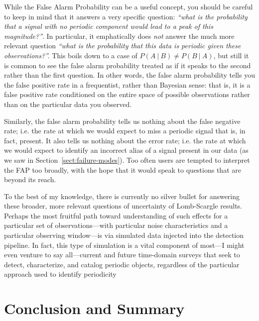 \documentclass[preprint]{aastex}
\newcommand{\Sect}[1]{Section~\ref{sect:#1}}
\newcommand{\sect}[1]{\Sect{#1}}
\newcommand{\sectlabel}[1]{\label{sect:#1}}
\begin{document}

While the False Alarm Probability can be a useful concept, you should be
careful to keep in mind that it answers a very specific question:
{\it ``what is the probability that a signal with no periodic component would
  lead to a peak of this magnitude?''}.
In particular, it emphatically does {\it not} answer the much more relevant
question {\it ``what is the probability that this data is periodic
  given these observations?''.}
This boils down to a case of $P(A~|~B) \ne P(B~|~A)$, but still it is common to
see the false alarm probability treated as if it speaks to the second rather
than the first question.
In other words, the false alarm probability tells you the false positive rate
in a frequentist, rather than Bayesian sense: that is, it is a false positive
rate conditioned on the entire space of possible observations rather than on
the particular data you observed.

Similarly, the false alarm probability tells us nothing about the false
negative rate; {i.e.} the rate at which
we would expect to miss a periodic signal that is, in fact, present.
It also tells us nothing about the error rate; {i.e.} the rate at which we
would expect to identify an incorrect alias of a signal present in our data
(as we saw in \sect{failure-modes}).
Too often users are tempted to interpret the FAP too broadly, with the hope that
it would speak to questions that are beyond its reach.

To the best of my knowledge, there is currently no silver bullet for answering
these broader, more relevant questions of uncertainty of Lomb-Scargle results.
Perhaps the most fruitful path toward understanding of such effects for a
particular set of observations---with particular noise characteristics and a
particular observing window---is via simulated data injected into the detection
pipeline.
In fact, this type of simulation is a vital component of most---I might even
venture to say all---current and future time-domain surveys that seek to
detect, characterize, and catalog periodic objects,
regardless of the particular approach used to identify periodicity
\citep[see, e.g.][]{opsim1, opsim2, Ivezic08LSST, Sesar2010,
  Oluseyi12, McQuillan2012, Drake2014}


\section{Conclusion and Summary}
\sectlabel{conclusion}
\end{document}
